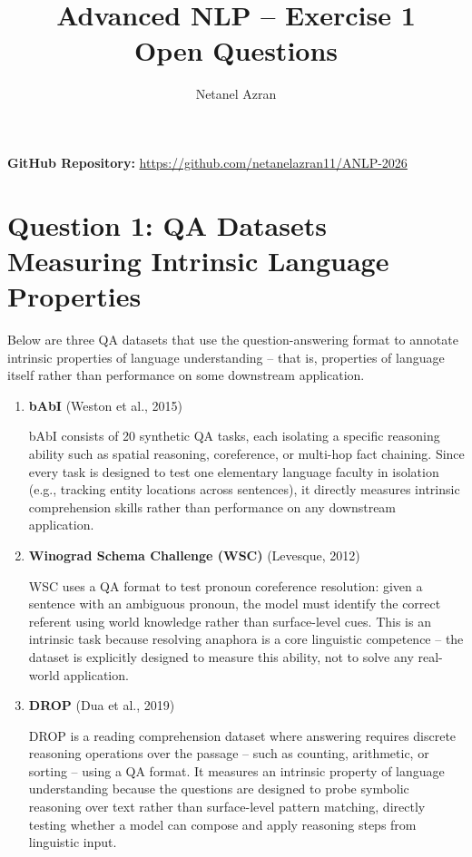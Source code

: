 \documentclass[12pt]{article}
\title{Advanced NLP -- Exercise 1 \\ \large Open Questions}
\author{Netanel Azran}
\date{}
\begin{document}
\maketitle

\noindent\textbf{GitHub Repository:} \url{https://github.com/netanelazran11/ANLP-2026}

\section*{Question 1: QA Datasets Measuring Intrinsic Language Properties}

Below are three QA datasets that use the question-answering format to annotate intrinsic
properties of language understanding -- that is, properties of language itself rather than
performance on some downstream application.

\begin{enumerate}

    \item \textbf{bAbI} (Weston et al., 2015)

    bAbI consists of 20 synthetic QA tasks, each isolating a specific reasoning ability
    such as spatial reasoning, coreference, or multi-hop fact chaining. Since every task
    is designed to test one elementary language faculty in isolation (e.g., tracking entity
    locations across sentences), it directly measures intrinsic comprehension skills rather
    than performance on any downstream application.

    \item \textbf{Winograd Schema Challenge (WSC)} (Levesque, 2012)

    WSC uses a QA format to test pronoun coreference resolution: given a sentence with an
    ambiguous pronoun, the model must identify the correct referent using world knowledge
    rather than surface-level cues. This is an intrinsic task because resolving anaphora
    is a core linguistic competence -- the dataset is explicitly designed to measure this
    ability, not to solve any real-world application.

    \item \textbf{DROP} (Dua et al., 2019)

    DROP is a reading comprehension dataset where answering requires discrete reasoning
    operations over the passage -- such as counting, arithmetic, or sorting -- using a
    QA format. It measures an intrinsic property of language understanding because the
    questions are designed to probe symbolic reasoning over text rather than surface-level
    pattern matching, directly testing whether a model can compose and apply reasoning
    steps from linguistic input.

\end{enumerate}
\end{document}
